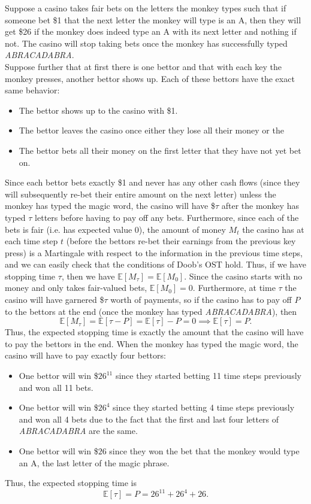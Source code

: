 \documentclass[12pt]{report}
\begin{document}
\begin{solution}
	Suppose a casino takes fair bets on the letters the monkey types such that if someone bet \$1 that the next letter the monkey will type is an A, then they will get \$26 if the monkey does indeed type an A with its next letter and nothing if not. The casino will stop taking bets once the monkey has successfully typed \textit{ABRACADABRA}. \\[0.1in]
	Suppose further that at first there is one bettor and that with each key the monkey presses, another bettor shows up. Each of these bettors have the exact same behavior: \begin{itemize}
		\item The bettor shows up to the casino with \$1.
		\item The bettor leaves the casino once either they lose all their money or the 
		\item The bettor bets all their money on the first letter that they have not yet bet on.
	\end{itemize}
	Since each bettor bets exactly \$1 and never has any other cash flows (since they will subsequently re-bet their entire amount on the next letter) unless the monkey has typed the magic word, the casino will have \$$\tau$ after the monkey has typed $\tau$ letters before having to pay off any bets. Furthermore, since each of the bets is fair (i.e. has expected value 0), the amount of money $M_t$ the casino has at each time step $t$ (before the bettors re-bet their earnings from the previous key press) is a Martingale with respect to the information in the previous time steps, and we can easily check that the conditions of Doob's OST hold. Thus, if we have stopping time $\tau$, then we have $\mathbb E[M_\tau]=\mathbb E[M_0]$. Since the casino starts with no money and only takes fair-valued bets, $\mathbb E[M_0]=0$. Furthermore, at time $\tau$ the casino will have garnered \$$\tau$ worth of payments, so if the casino has to pay off $P$ to the bettors at the end (once the monkey has typed \textit{ABRACADABRA}), then $$ \mathbb E[M_\tau] = \mathbb E[\tau-P] = \mathbb E[\tau]-P = 0 \implies \mathbb E[\tau] = P. $$ Thus, the expected stopping time is exactly the amount that the casino will have to pay the bettors in the end. When the monkey has typed the magic word, the casino will have to pay exactly four bettors: \begin{itemize}
		\item One bettor will win \$$26^{11}$ since they started betting 11 time steps previously and won all 11 bets.
		\item One bettor will win \$$26^4$ since they started betting 4 time steps previously and won all 4 bets due to the fact that the first and last four letters of \textit{ABRACADABRA} are the same.
		\item One bettor will win \$$26$ since they won the bet that the monkey would type an A, the last letter of the magic phrase.
	\end{itemize}
	Thus, the expected stopping time is $$ \mathbb E[\tau] = P = 26^{11} + 26^4 + 26. $$ 
\end{solution}
\end{document}
